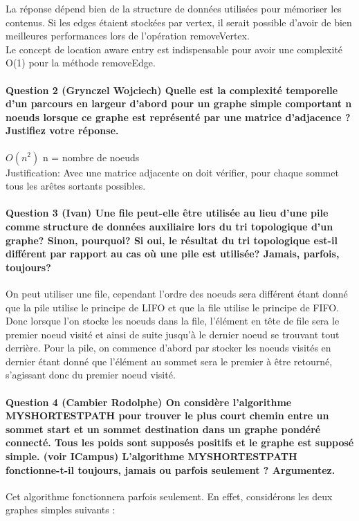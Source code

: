 \documentclass[a4paper]{article}
\begin{document}
La réponse dépend bien de la structure de données utilisées pour mémoriser les contenus. Si les edges étaient stockées par vertex, il serait possible d'avoir de bien meilleures performances lors de l'opération removeVertex.\\

Le concept de location aware entry est indispensable pour avoir une complexité O(1) pour la méthode removeEdge.

\paragraph{Question 2 (Grynczel Wojciech) Quelle est la complexité temporelle d’un parcours en largeur d’abord pour un	graphe simple comportant n noeuds lorsque ce graphe est représenté par une matrice d’adjacence ? Justifiez votre réponse.\\}

$ O(n^2) $ 	n = nombre de noeuds\\
Justification: Avec une matrice adjacente on doit vérifier, pour chaque sommet  tous les arêtes sortants possibles.


\paragraph{Question 3 (Ivan) Une file peut-elle être utilisée au lieu d'une pile comme structure de données auxiliaire lors du tri topologique d'un graphe? Sinon, pourquoi? Si oui, le résultat du tri topologique est-il différent par rapport au cas où une pile est utilisée? Jamais, parfois, toujours? \\}

On peut utiliser une file, cependant l'ordre des noeuds sera différent étant donné que la pile utilise le principe de LIFO et que la file utilise le principe de FIFO. Donc lorsque l'on stocke les noeuds dans la file, l'élément en tête de file sera le premier noeud visité et ainsi de suite jusqu'à le dernier noeud se trouvant tout derrière. Pour la pile, on commence d'abord par stocker les noeuds visités en dernier étant donné que l'élément au sommet sera le premier à être retourné, s'agissant donc du premier noeud visité. \\


\paragraph{Question 4 (Cambier Rodolphe) On considère l’algorithme MYSHORTESTPATH pour trouver le plus court chemin
entre un sommet start et un sommet destination dans un graphe pondéré
connecté. Tous les poids sont supposés positifs et le graphe est supposé simple. (voir ICampus) 
L’algorithme MYSHORTESTPATH fonctionne-t-il toujours, jamais ou parfois seulement
? Argumentez.} Cet algorithme fonctionnera parfois seulement. En effet, considérons les deux graphes simples suivants :
\end{document}
